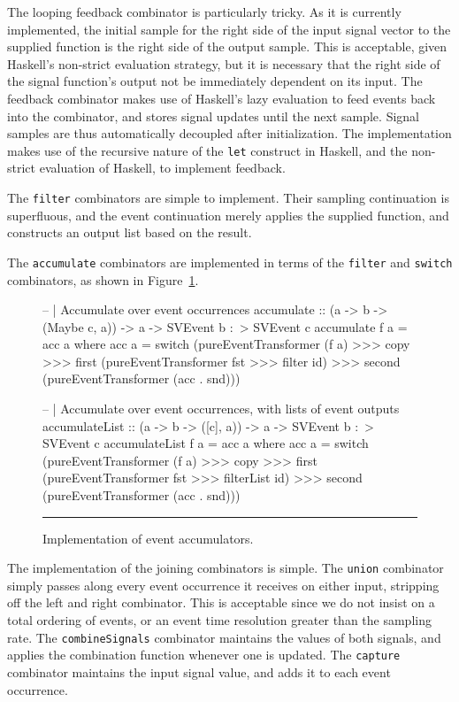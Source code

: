The looping feedback combinator is particularly tricky. As it is currently
implemented, the initial sample for the right side of the input signal vector to
the supplied function is the right side of the output sample. This is acceptable,
given Haskell's non-strict evaluation strategy, but it is necessary that the
right side of the signal function's output not be immediately dependent on its
input. The feedback combinator makes use of Haskell's lazy evaluation to
feed events back into the combinator, and stores signal updates until the next
sample. Signal samples are thus automatically decoupled after initialization.
The implementation makes use of the recursive nature of the {\tt let} construct
in Haskell, and the non-strict evaluation of Haskell, to implement feedback.


The {\tt filter} combinators are simple to implement. Their sampling
continuation is superfluous, and the event continuation merely applies the
supplied function, and constructs an output list based on the result.

The {\tt accumulate} combinators are implemented in terms of the {\tt filter}
and {\tt switch} combinators, as shown in
Figure~\ref{figure:accumulate_implementation}.

\begin{figure}
\begin{code}
-- | Accumulate over event occurrences
accumulate :: (a -> b -> (Maybe c, a)) -> a -> SVEvent b :~> SVEvent c
accumulate f a = acc a
  where acc a = switch (pureEventTransformer (f a) >>>
                        copy >>>
                        first (pureEventTransformer fst >>> filter id) >>>
                        second (pureEventTransformer (acc . snd)))

-- | Accumulate over event occurrences, with lists of event outputs
accumulateList :: (a -> b -> ([c], a)) -> a -> SVEvent b :~> SVEvent c
accumulateList f a = acc a
  where acc a = switch (pureEventTransformer (f a) >>>
                        copy >>>
                        first (pureEventTransformer fst >>> filterList id) >>>
                        second (pureEventTransformer (acc . snd)))
\end{code}
\hrule
\caption{Implementation of event accumulators.}
\label{figure:accumulate_implementation}
\end{figure}

The implementation of the joining combinators is simple. The {\tt union}
combinator simply passes along every event occurrence it receives on either
input, stripping off the left and right combinator. This is acceptable since we
do not insist on a total ordering of events, or an event time resolution greater
than the sampling rate. The {\tt combineSignals} combinator maintains the values
of both signals, and applies the combination function whenever one is updated.
The {\tt capture} combinator maintains the input signal value, and adds it to
each event occurrence.


